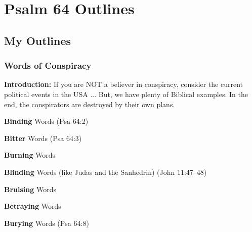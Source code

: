 \section{Psalm 64 Outlines}

\subsection{My Outlines}

\subsubsection{Words of Conspiracy}
\textbf{Introduction: }If you are NOT a believer in conspiracy, consider the current political events in the USA ... But, we have plenty of Biblical examples. In the end, the conspirators are destroyed by their own plans.\\

\begin{compactenum}[I.][7]
    \item \textbf{Binding} Words (Psa 64:2)
    \item \textbf{Bitter} Words (Psa 64:3)
    \item \textbf{Burning} Words %
    \item \textbf{Blinding} Words (like Judas and the Sanhedrin) (John 11:47--48)
    \item \textbf{Bruising} Words %
    \item \textbf{Betraying} Words %
    \item \textbf{Burying} Words (Psa 64:8)
\end{compactenum}

